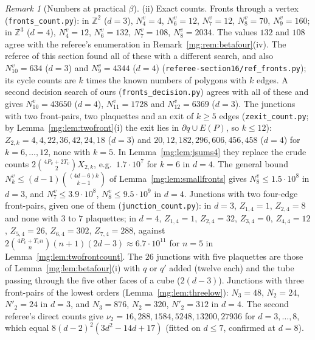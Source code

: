 \documentclass[11pt,a4paper]{article}
\theoremstyle{definition}
\theoremstyle{remark}
\newtheorem{remark}[theorem]{Remark}
\newcommand{\Z}{\mathbb{Z}}
\begin{document}
\begin{remark}[Numbers at practical $\beta$]
(ii) Exact counts. Fronts through a vertex (\texttt{fronts\_count.py}): in $\Z^2$ ($d=3$), $N^v_4=4$, $N^v_6=12$, $N^v_7=12$, $N^v_8=70$, $N^v_9=160$; in $\Z^3$ ($d=4$),
$N^v_4=12$, $N^v_6=132$, $N^v_7=108$, $N^v_8=2034$. The values $132$ and $108$ agree with the referee's enumeration in Remark~\ref{mg:rem:betafour}(iv). The referee of this section
found all of these with a different search, and also $N^v_{10}=634$ ($d=3$) and $N^v_9=4344$ ($d=4$) (\texttt{referee-section16/ref\_fronts.py}); its cycle counts are
$k$ times the known numbers of polygons with $k$ edges. A second decision search of ours (\texttt{fronts\_decision.py}) agrees with all of these and gives $N^v_{10}=43650$ ($d=4$),
$N^v_{11}=1728$ and $N^v_{12}=6369$ ($d=3$). The junctions with two front-pairs, two plaquettes and an exit of $k\ge5$ edges (\texttt{zexit\_count.py}; by
Lemma~\ref{mg:lem:twofront}(i) the exit lies in $\partial q\cup E(P)$, so $k\le12$): $Z_{2,k}=4,4,22,36,42,24,18$ ($d=3$) and $20,12,182,296,606,456,458$ ($d=4$) for
$k=6,\dots,12$, none with $k=5$. In Lemma~\ref{mg:lem:jsums4} they replace the crude counts $2\binom{4P_v+2T_v}2X_{2,k}$, e.g.\ $1.7\cdot10^7$ for $k=6$ in $d=4$. The general bound $N^v_k\le(d-1)\binom{(4d-6)k}{k-1}$ of
Lemma~\ref{mg:lem:smallfronts} gives $N^v_8\le1.5\cdot10^8$ in $d=3$, and $N^v_7\le3.9\cdot10^8$, $N^v_8\le9.5\cdot10^9$ in $d=4$. Junctions with two four-edge
front-pairs, given one of them (\texttt{junction\_count.py}): in $d=3$, $Z_{1,4}=1$, $Z_{2,4}=8$ and none with $3$ to $7$ plaquettes; in $d=4$, $Z_{1,4}=1$, $Z_{2,4}=32$,
$Z_{3,4}=0$, $Z_{4,4}=12$, $Z_{5,4}=26$, $Z_{6,4}=302$, $Z_{7,4}=288$, against $2\binom{4P_v+T_vn}n(n+1)(2d-3)\approx6.7\cdot10^{11}$ for $n=5$ in Lemma~\ref{mg:lem:twofrontcount}. The
$26$ junctions with five plaquettes are those of Lemma~\ref{mg:lem:betafour}(i) with $q$ or $q'$ added (twelve each) and the tube passing through the five other faces of a
cube ($2(d-3)$). Junctions with three front-pairs of the lowest orders (Lemma~\ref{mg:lem:threelow}): $N_3=48$, $N_2=24$, $N'_2=24$ in $d=3$, and $N_3=876$, $N_2=320$, $N'_2=312$ in $d=4$. The second referee's direct counts give $\nu_2=16,288,1584,5248,13200,27936$ for $d=3,\dots,8$, which equal $8(d-2)^2(3d^2-14d+17)$ (fitted on
$d\le7$, confirmed at $d=8$).


\end{remark}
\end{document}

